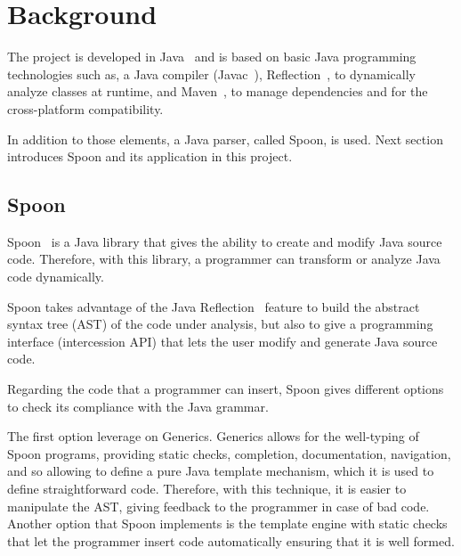 \chapter{Background}\label{ch:background}
The project is developed in Java~\cite{Arnold:2000:JPL:556709} and is based on basic Java programming technologies such as, a Java compiler (Javac~\cite{javacWiki}), Reflection~\cite{reflect}, to dynamically analyze classes at runtime, and Maven~\cite{bharathan2015apache}, to manage dependencies and for the cross-platform compatibility.

In addition to those elements, a Java parser, called Spoon, is used. Next section introduces Spoon and its application in this project.

\section{Spoon}\label{sec:spoon}
Spoon~\cite{pawlak:hal-01169705} is a Java library that gives the ability to create and modify Java source code. Therefore, with this library, a programmer can transform or analyze Java code dynamically.

Spoon takes advantage of the Java Reflection~\cite{reflect} feature to build the abstract syntax tree (AST) of the code under analysis, but also to give a programming interface (intercession API) that lets the user modify and generate Java source code.


Regarding the code that a programmer can insert, Spoon gives different options to check its compliance with the Java grammar.

The first option leverage on Generics.
Generics allows for the well-typing of Spoon programs, providing static checks, completion, documentation, navigation, and so allowing to define a pure Java template mechanism, which it is used to define straightforward code.
Therefore, with this technique, it is easier to manipulate the AST, giving feedback to the programmer in case of bad code.
Another option that Spoon implements is the template engine with static checks that let the programmer insert code automatically ensuring that it is well formed.


